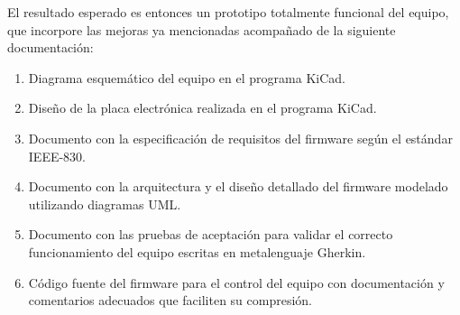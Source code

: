 El resultado esperado es entonces un prototipo totalmente funcional del equipo, que incorpore las mejoras ya mencionadas acompañado de la siguiente documentación:

\begin{enumerate}
	\item Diagrama esquemático del equipo en el programa KiCad.
	\item Diseño de la placa electrónica realizada en el programa KiCad.
	\item Documento con la especificación de requisitos del firmware según el estándar IEEE-830.
	\item Documento con la arquitectura y el diseño detallado del firmware modelado utilizando diagramas UML.
	\item Documento con las pruebas de aceptación para validar el correcto funcionamiento del equipo escritas en metalenguaje Gherkin. 
	\item Código fuente del firmware para el control del equipo con documentación y comentarios adecuados que faciliten su compresión.
\end{enumerate}